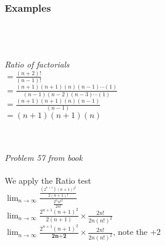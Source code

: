 \documentclass{article}
\begin{document}
        \endgroup
    \subsubsection{Examples}    

        \begingroup
        \centering

        \\

        \hrulefill \\[10pt]

        \\[5pt]
        \textit{Ratio of factorials}\\[15pt]

        $=\frac{(n+2)!}{(n-1)!}$\\[15pt]
        
        $= \frac{(n+1)(n+1)(n)(n-1)\cdots(1)}{(n-1)(n-2)(n-3)\cdots(1)}$\\[15pt]
        
        $= \frac{(n+1)(n+1)(n)(n-1)}{(n-1)}$\\[15pt]

        $= {(n+1)(n+1)(n)}$\\[15pt]
\pagebreak
        \endgroup

        \begingroup 
        \centering
        \\
        \hrulefill \\[10pt]

        \textit{Problem 57 from book}\\ [15pt]
        
         \\ [10pt]
        We apply the Ratio test \\ [15pt]

        $\displaystyle \lim_{n \rightarrow \infty} \frac{\frac{(2^{n+1})(n+1)!^2}{2(n+1)!}}{\frac{2^nn!^2}{2n!}}$\\ [10pt]

        $\displaystyle \lim_{n \rightarrow \infty} \frac{2^{n+1}(n+1)^2}{2(n+1)} \times \frac{2n!}{2n(n!)^2}$\\[10pt]

        $\displaystyle \lim_{n \rightarrow \infty} \frac{2^{n+1}(n+1)^2}{\textbf{2n+2}}\times \frac{2n!}{2n(n!)^2}$,      {\tiny note the +2}\\[10pt]
\end{document}
